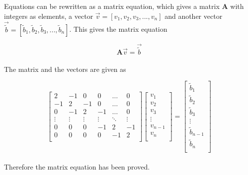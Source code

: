 \documentclass{article}
\begin{document}
    Equations can be rewritten as a matrix equation, which gives a matrix \textbf{A} with integers as elements, a vector $\vec{v} = [v_1, v_2, v_3, ... , v_n]$ and another vector $\vec{\tilde{b}} = [\tilde{b}_1, \tilde{b}_2, \tilde{b}_3, ... , \tilde{b}_n]$. This gives the matrix equation

    \begin{equation}
      \textbf{A} \vec{v} = \vec{\tilde{b}}  \label{eq:3a1}
    \end{equation} \\

    The matrix and the vectors are given as

    \begin{equation*}
      \begin{bmatrix}
          2 & -1 & 0 & 0 & \dots & 0 \\
          -1 & 2 & -1 & 0 & \dots & 0 \\
          0 & -1 & 2 & -1 & \dots & 0 \\
          \vdots & \vdots & \vdots & \vdots & \ddots & \vdots \\
              0 & 0 & 0 & -1 & 2 & -1 \\
              0 & 0 & 0 & 0 & -1 & 2 \\
      \end{bmatrix}
      \begin{bmatrix}
          v_1 \\
          v_2 \\
          v_3 \\
          \vdots \\
          v_{n-1} \\
          v_n \\
      \end{bmatrix}
      =
      \begin{bmatrix}
          \tilde{b}_1 \\
          \tilde{b}_2 \\
          \tilde{b}_3 \\
          \vdots \\
          \tilde{b}_{n-1} \\
          \tilde{b}_n \\
      \end{bmatrix}
    \end{equation*} \\

    Therefore the matrix equation has been proved. \\
\end{document}
